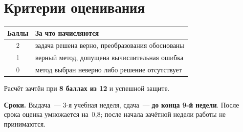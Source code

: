 \documentclass[12pt, a4paper]{article}
\begin{document}
\section*{Критерии оценивания}

\begin{center}
\begin{tabular}{|c|l|}
  \hline
  Баллы & За что начисляются \\
  \hline
  2 & задача решена верно, преобразования обоснованы \\
  1 & верный метод, допущена вычислительная ошибка \\
  0 & метод выбран неверно либо решение отсутствует \\
  \hline
\end{tabular}
\end{center}

\vspace{0.5em}
\noindent
Расчёт зачтён при \textbf{8 баллах из 12} и успешной защите.

\vspace{0.7em}
\noindent\textbf{Сроки.} Выдача~--- 3-я учебная неделя,
сдача~--- \textbf{до конца 9-й недели}. После срока оценка умножается на~0{,}8;
после начала зачётной недели работы не принимаются.
\end{document}
